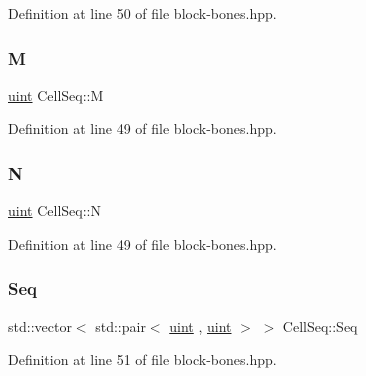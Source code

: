 Definition at line 50 of file block-\/bones.\+hpp.

\mbox{\label{class_cell_seq_a8710fd7f03b3f4423e90f4a2910ad98b}} 
\subsubsection{\texorpdfstring{M}{M}}
{\footnotesize\ttfamily \hyperlink{typedefs_8hpp_a91ad9478d81a7aaf2593e8d9c3d06a14}{uint} Cell\+Seq\+::M\hspace{0.3cm}{\ttfamily [protected]}}



Definition at line 49 of file block-\/bones.\+hpp.

\mbox{\label{class_cell_seq_a407684cfa214fe0b2d4d1ed25936d037}} 
\subsubsection{\texorpdfstring{N}{N}}
{\footnotesize\ttfamily \hyperlink{typedefs_8hpp_a91ad9478d81a7aaf2593e8d9c3d06a14}{uint} Cell\+Seq\+::N\hspace{0.3cm}{\ttfamily [protected]}}



Definition at line 49 of file block-\/bones.\+hpp.

\mbox{\label{class_cell_seq_af15df5f62488560f36f71336ac5cb0a5}} 
\subsubsection{\texorpdfstring{Seq}{Seq}}
{\footnotesize\ttfamily std\+::vector$<$ std\+::pair$<$ \hyperlink{typedefs_8hpp_a91ad9478d81a7aaf2593e8d9c3d06a14}{uint} , \hyperlink{typedefs_8hpp_a91ad9478d81a7aaf2593e8d9c3d06a14}{uint} $>$ $>$ Cell\+Seq\+::\+Seq\hspace{0.3cm}{\ttfamily [protected]}}



Definition at line 51 of file block-\/bones.\+hpp.

\mbox{\label{class_cell_seq_aa813f6c9f5438cc472a0c12078b44c97}} 
